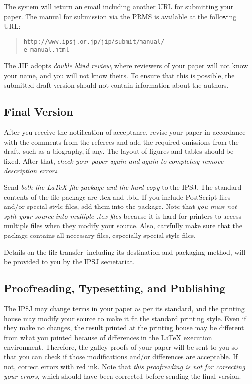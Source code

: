 \documentclass[JIP]{ipsj}
\def\|{\verb|}
\begin{document}
\noindent
The system will return an email including another URL for submitting
your paper. The manual for submission via the PRMS is available at the
following URL: 
\begin{quote}
 \small
 \|http://www.ipsj.or.jp/jip/submit/manual/|\\
 \|e_manual.html|
\end{quote}

The JIP adopts \textit{double blind review}, where reviewers of your
paper will not know your name, and you will not know theirs.  To ensure
that this is possible, the submitted draft version should not contain
information about the authors.

\subsection{Final Version}

After you receive the notification of acceptance, revise your paper in
accordance with the comments from the referees and add the required
omissions from the draft, such as a biography, if any. The layout of
figures and tables should be fixed. After that, \textit{check your paper
again and again to completely remove description errors}.

Send \textit{both the {\LaTeX} file package and the hard copy} to the
IPSJ\@. The standard contents of the file package are .tex and .bbl. If
you include PostScript files and/or special style files, add them into
the package. Note that \textit{you must not split your source into
multiple .tex files} because it is hard for printers to access multiple
files when they modify your source. Also, carefully make sure that the
package contains all necessary files, especially special style files.

Details on the file transfer, including its destination and packaging
method, will be provided to you by the IPSJ secretariat.

\subsection{Proofreading, Typesetting, and Publishing}

The IPSJ may change terms in your paper as per its standard, and the
printing house may modify your source to make it fit the standard
printing style.  Even if they make no changes, the result printed at the
printing house may be different from what you printed because of
differences in the {\LaTeX} execution environment.  Therefore, the
galley proofs of your paper will be sent to you so that you can check if
those modifications and/or differences are acceptable.  If not, correct
errors with red ink.  Note that \textit{this proofreading is not for
correcting your errors}, which should have been corrected before sending
the final version.
\end{document}
